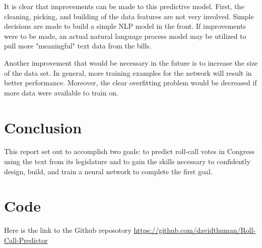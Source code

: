 \documentclass[%
 reprint,
 amsmath,amssymb,
 aps,
]{revtex4-2}
\begin{document}
It is clear that improvements can be made to this predictive model. First, the cleaning, picking, and building of the data features are not very involved. Simple decisions are made to build a simple NLP model in the front. If improvements were to be made, an actual natural language process model may be utilized to pull more "meaningful" text data from the bills.

Another improvement that would be necessary in the future is to increase the size of the data set. In general, more training examples for the network will result in better performance. Moreover, the clear overfitting problem would be decreased if more data were available to train on.

\section{Conclusion}

This report set out to accomplish two goals: to predict roll-call votes in Congress using the text from its legislature and to gain the skills necessary to confidently design, build, and train a neural network to complete the first goal.

\appendix

\section{Code}

Here is the link to the Github reposotory \url{https://github.com/davidthuman/Roll-Call-Predictor}

\nocite{*}

\end{document}
